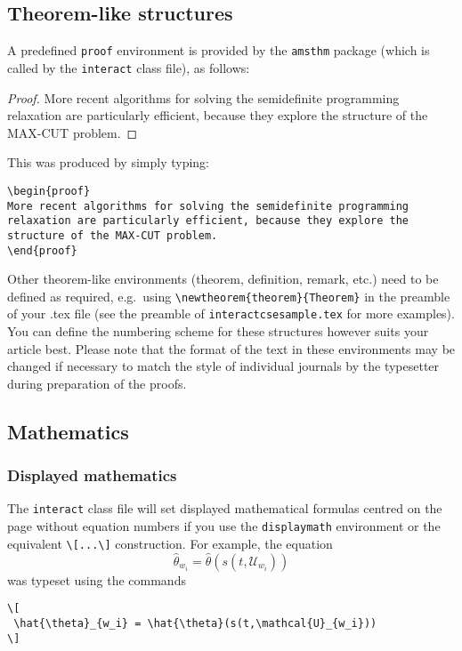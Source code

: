 \documentclass[]{interact}
\theoremstyle{plain}%
\theoremstyle{definition}
\theoremstyle{remark}
\begin{document}
\subsection{Theorem-like structures}

A predefined \verb"proof" environment is provided by the \texttt{amsthm} package (which is called by the \texttt{interact} class file), as follows:
\begin{proof}
More recent algorithms for solving the semidefinite programming relaxation are particularly efficient, because they explore the structure of the MAX-CUT problem.
\end{proof}
\noindent This was produced by simply typing:
\begin{verbatim}
\begin{proof}
More recent algorithms for solving the semidefinite programming
relaxation are particularly efficient, because they explore the
structure of the MAX-CUT problem.
\end{proof}
\end{verbatim}
Other theorem-like environments (theorem, definition, remark, etc.) need to be defined as required, e.g.\ using \verb"\newtheorem{theorem}{Theorem}" in the preamble of your .tex file (see the preamble of \verb"interactcsesample.tex" for more examples). You can define the numbering scheme for these structures however suits your article best. Please note that the format of the text in these environments may be changed if necessary to match the style of individual journals by the typesetter during preparation of the proofs.


\subsection{Mathematics}

\subsubsection{Displayed mathematics}

The \texttt{interact} class file will set displayed mathematical formulas centred on the page without equation numbers if you use the \texttt{displaymath} environment or the equivalent \verb"\[...\]" construction. For example, the equation
\[
 \hat{\theta}_{w_i} = \hat{\theta}(s(t,\mathcal{U}_{w_i}))
\]
was typeset using the commands
\begin{verbatim}
\[
 \hat{\theta}_{w_i} = \hat{\theta}(s(t,\mathcal{U}_{w_i}))
\]
\end{verbatim}
\end{document}
